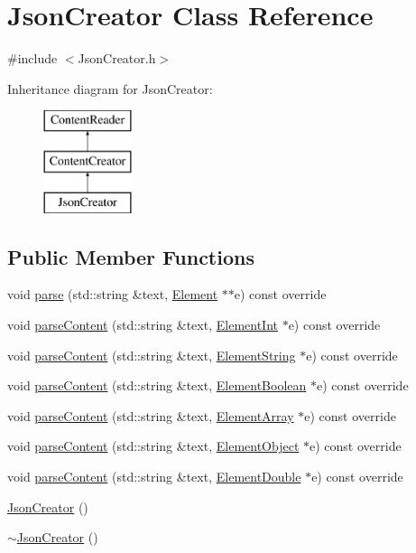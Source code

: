\hypertarget{classJsonCreator}{}\section{Json\+Creator Class Reference}
\label{classJsonCreator}


{\ttfamily \#include $<$Json\+Creator.\+h$>$}

Inheritance diagram for Json\+Creator\+:\begin{figure}[H]
\begin{center}
\leavevmode
\includegraphics[height=3.000000cm]{classJsonCreator}
\end{center}
\end{figure}
\subsection*{Public Member Functions}
\begin{DoxyCompactItemize}
\item 
void \mbox{\hyperlink{classJsonCreator_a505ff309c6b144d29478804b0e187c6f}{parse}} (std\+::string \&text, \mbox{\hyperlink{classElement}{Element}} $\ast$$\ast$e) const override
\item 
void \mbox{\hyperlink{classJsonCreator_a0fe34794ee3563c3e0bc35006129fcdc}{parse\+Content}} (std\+::string \&text, \mbox{\hyperlink{classElementInt}{Element\+Int}} $\ast$e) const override
\item 
void \mbox{\hyperlink{classJsonCreator_acf8d7cd3dcbb669fd9eb5dec95e069f3}{parse\+Content}} (std\+::string \&text, \mbox{\hyperlink{classElementString}{Element\+String}} $\ast$e) const override
\item 
void \mbox{\hyperlink{classJsonCreator_a95fb65046a7467b8e48feaf92a62b40c}{parse\+Content}} (std\+::string \&text, \mbox{\hyperlink{classElementBoolean}{Element\+Boolean}} $\ast$e) const override
\item 
void \mbox{\hyperlink{classJsonCreator_a694669d359eb73890a9e9f247c4ebab4}{parse\+Content}} (std\+::string \&text, \mbox{\hyperlink{classElementArray}{Element\+Array}} $\ast$e) const override
\item 
void \mbox{\hyperlink{classJsonCreator_a9f57af1a7925074b8e3e4175f74c886a}{parse\+Content}} (std\+::string \&text, \mbox{\hyperlink{classElementObject}{Element\+Object}} $\ast$e) const override
\item 
void \mbox{\hyperlink{classJsonCreator_a5e841806165fd5cb595d9f7d7c924080}{parse\+Content}} (std\+::string \&text, \mbox{\hyperlink{classElementDouble}{Element\+Double}} $\ast$e) const override
\item 
\mbox{\hyperlink{classJsonCreator_a71197e5dafee7dd9c04c208413050860}{Json\+Creator}} ()
\item 
\mbox{\hyperlink{classJsonCreator_a061eaa469894ab51ae6c046016da9e40}{$\sim$\+Json\+Creator}} ()
\end{DoxyCompactItemize}


